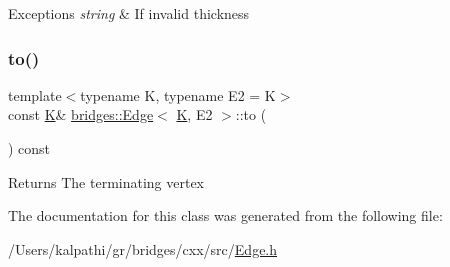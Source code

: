 \begin{DoxyExceptions}{Exceptions}
{\em string} & If invalid thickness \\
\hline
\end{DoxyExceptions}
\mbox{\label{classbridges_1_1_edge_a13f76b5a36e89d637d1abddf41a81afa}} 
\subsubsection{\texorpdfstring{to()}{to()}}
{\footnotesize\ttfamily template$<$typename K, typename E2 = K$>$ \\
const \mbox{\hyperlink{namespacebridges_acfb0a4f7877d8f63de3e6862004c50edaa5f3c6a11b03839d46af9fb43c97c188}{K}}\& \mbox{\hyperlink{classbridges_1_1_edge}{bridges\+::\+Edge}}$<$ \mbox{\hyperlink{namespacebridges_acfb0a4f7877d8f63de3e6862004c50edaa5f3c6a11b03839d46af9fb43c97c188}{K}}, E2 $>$\+::to (\begin{DoxyParamCaption}{ }\end{DoxyParamCaption}) const\hspace{0.3cm}{\ttfamily [inline]}}

\begin{DoxyReturn}{Returns}
The terminating vertex 
\end{DoxyReturn}


The documentation for this class was generated from the following file\+:\begin{DoxyCompactItemize}
\item 
/\+Users/kalpathi/gr/bridges/cxx/src/\mbox{\hyperlink{_edge_8h}{Edge.\+h}}\end{DoxyCompactItemize}
